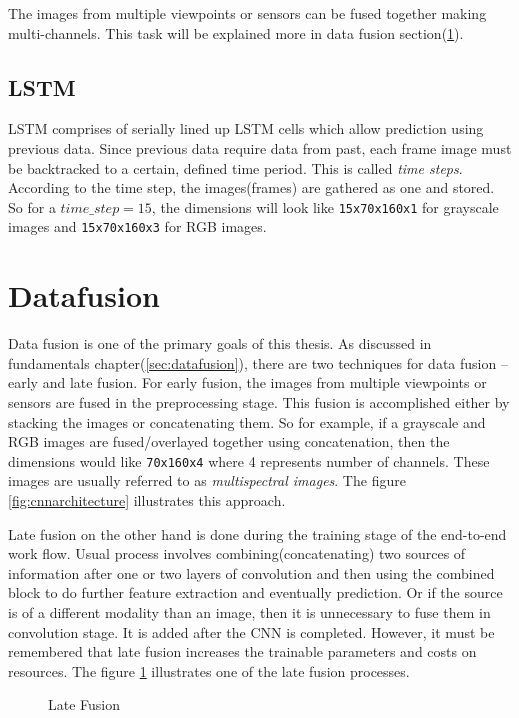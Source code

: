 The images from multiple viewpoints or sensors can be fused together making
multi-channels. This task will be explained more in data fusion
section(\ref{sec:datafusion1}).

\subsection{LSTM}
LSTM comprises of serially lined up LSTM cells which allow prediction using previous
data. Since previous data require data from past, each frame image must be backtracked to
a certain, defined time period. This is called \textit{time steps}. According to the time
step, the images(frames) are gathered as one and stored. So for a $time\_step = 15$, the
dimensions will look like \texttt{15x70x160x1} for grayscale images and \texttt{15x70x160x3} for RGB
images.

\section{Datafusion}
\label{sec:datafusion1}
Data fusion is one of the primary goals of this thesis. As discussed in fundamentals
chapter(\ref{sec:datafusion}), there are two techniques for data fusion -- early and late
fusion. For early fusion, the images from multiple viewpoints or sensors are fused in the
preprocessing stage. This fusion is accomplished either by stacking the images or
concatenating them. So for example, if a grayscale and RGB images are fused/overlayed together using
concatenation, then the dimensions would like \texttt{70x160x4} where 4 represents number
of channels. These images are usually referred to as \textit{multispectral images}. The figure \ref{fig:cnnarchitecture} illustrates this approach.

Late fusion on the other hand is done during the training stage of the end-to-end work
flow. Usual process involves combining(concatenating) two sources of information after one
or two layers of convolution and then using the combined block to do further feature
extraction and eventually prediction. Or if the source is of a different modality than an
image, then it is unnecessary to fuse them in convolution stage. It is added after
the CNN is completed. However, it must be remembered that late fusion increases the
trainable parameters and costs on resources. The figure \ref{fig:latefusion} illustrates
one of the late fusion processes.

\begin{figure}[h]
    \centering
    \def\svgwidth{\textwidth}
    
    \caption{Late Fusion}
    \label{fig:latefusion}
\end{figure}

